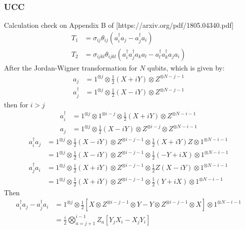 \documentclass[11pt, oneside]{article}   	%
\begin{document}
\subsubsection{UCC}
Calculation  check on Appendix B of [https://arxiv.org/pdf/1805.04340.pdf]
\begin{align} 
T_1 &= \sigma_{ij} \theta_{ij} (a^{\dagger}_i a_j - a^{\dagger}_j a_i) \\
T_2 &= \sigma_{ijkl} \theta_{ijkl} (a^{\dagger}_i a^{\dagger}_j a_k a_l - a^{\dagger}_l a^{\dagger}_k a_j a_i) 
\end{align}
After the Jordan-Wigner transformation for $N$ qubits, which is given by:
\begin{align} 
a_j &= 1^{\otimes j} \otimes \frac{1}{2} (X + i Y) \otimes Z^{\otimes N - j -1} \\
a^{\dagger}_j &= 1^{\otimes j} \otimes \frac{1}{2} (X - i Y) \otimes Z^{\otimes N - j -1} 
\end{align}
then for $i > j$
\begin{align} 
a^{\dagger}_i &= 1^{\otimes j} \otimes 1^{\otimes i-j} \otimes  \frac{1}{2} (X + i Y) \otimes Z^{\otimes N - i -1} \\
a_j &= 1^{\otimes j} \otimes \frac{1}{2} (X - i Y) \otimes Z^{\otimes i - j} \otimes Z^{\otimes N - i -1}
\end{align}
\begin{align} 
a^{\dagger}_i a_j  
&= 1^{\otimes j} \otimes \frac{1}{2} (X - i Y) \otimes Z^{\otimes i-j-1} \otimes \frac{1}{2} (X + i Y) Z \otimes 1^{\otimes N - i -1} \\
&= 1^{\otimes j} \otimes \frac{1}{2} (X - i Y) \otimes Z^{\otimes i-j-1} \otimes \frac{1}{2} (-Y + i X) \otimes 1^{\otimes N - i -1} \\
a^{\dagger}_j a_i 
&= 1^{\otimes j} \otimes \frac{1}{2} (X + i Y) \otimes Z^{\otimes i - j-1}  \otimes \frac{1}{2} Z (X - i Y) \otimes 1^{\otimes N - i -1} \\
&= 1^{\otimes j} \otimes \frac{1}{2} (X + i Y) \otimes Z^{\otimes i-j-1} \otimes \frac{1}{2} (Y + i X) \otimes 1^{\otimes N - i -1} 
\end{align}
Then
\begin{align}
a^{\dagger}_i a_j - a^{\dagger}_j a_i 
&= 1^{\otimes j} \otimes  \frac{1}{2} 
\left[ X \otimes Z^{\otimes i-j-1} \otimes Y - Y \otimes Z^{\otimes i-j-1} \otimes X \right] 
\otimes 1^{\otimes N - i -1} \\
& = \frac{i}{2} \bigotimes^{i-1}_{a=j+1} Z_a \left[ Y_j X_i - X_j Y_i  \right] 
\end{align}
\end{document}
